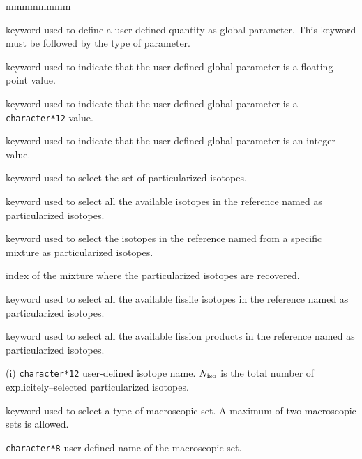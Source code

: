 \begin{ListeDeDescription}{mmmmmmmm}
\item[\moc{VALE}] keyword used to define a user-defined quantity as global parameter.
This keyword must be followed by the type of parameter.

\item[\moc{FLOT}] keyword used to indicate that the user-defined global parameter
is a floating point value.

\item[\moc{CHAI}] keyword used to indicate that the user-defined global parameter
is a {\tt character*12} value.

\item[\moc{ENTI}] keyword used to indicate that the user-defined global parameter
is an integer value.

\item[\moc{ISOT}] keyword used to select the set of particularized isotopes.

\item[\moc{TOUT}] keyword used to select all the available isotopes in the reference
 named  as particularized isotopes.

\item[\moc{MILI}] keyword used to select the isotopes in the reference
 named  from a specific mixture as particularized isotopes.

\item[\dusa{imil}] index of the mixture where the particularized isotopes are recovered.

\item[\moc{FISS}] keyword used to select all the available fissile isotopes in the reference
 named  as particularized isotopes.

\item[\moc{PF}] keyword used to select all the available fission products in the reference
 named  as particularized isotopes.

\item[\dusa{HNAISO}(i)] {\tt character*12} user-defined isotope name. $N_{\rm iso}$ is the
total number of explicitely--selected particularized isotopes.

\item[\moc{MACR}] keyword used to select a type of macroscopic set. A maximum of two macroscopic sets is allowed.

\item[\dusa{HNAMAC}] {\tt character*8} user-defined name of the macroscopic set.


\end{ListeDeDescription}
